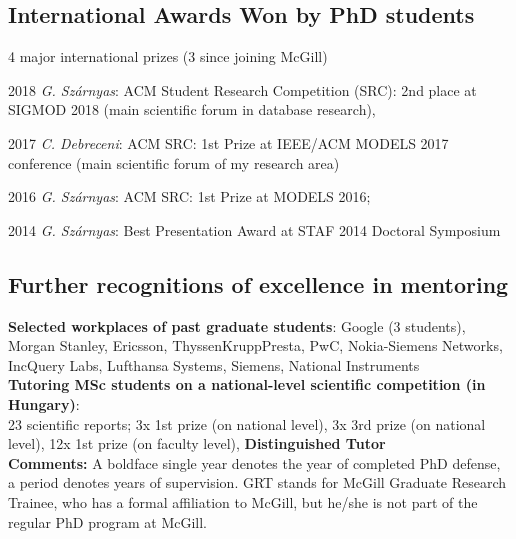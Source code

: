\subsection{International Awards Won by PhD students}

4 major international prizes (3 since joining McGill) 
\begin{yearlist}
\item[2018] \emph{G. Sz\'arnyas}: ACM Student Research Competition (SRC): 2nd place at SIGMOD 2018 (main scientific forum in database research),
\item[2017] \emph{C. Debreceni}: ACM SRC: 1st Prize at IEEE/ACM MODELS 2017 conference (main scientific forum of my research area)
\item[2016] \emph{G. Sz\'arnyas}: ACM SRC: 1st Prize at MODELS 2016; 
\item[2014] \emph{G. Sz\'arnyas}: Best Presentation Award at STAF 2014 Doctoral Symposium
\end{yearlist}

\subsection{Further recognitions of excellence in mentoring}

\textbf{Selected workplaces of past graduate students}: Google (3 students), Morgan Stanley, Ericsson, ThyssenKruppPresta, PwC, Nokia-Siemens Networks, 
IncQuery Labs, Lufthansa Systems, Siemens, National Instruments \\

\noindent
\textbf{Tutoring MSc students on a national-level scientific competition (in Hungary)}: \\
23 scientific reports; 3x 1st prize (on national level), 3x 3rd prize (on national
level), 12x 1st prize (on faculty level), %
\textbf{Distinguished Tutor}  \\%

\noindent
\textbf{Comments:} A boldface single year denotes the year of completed PhD defense, a period denotes years of supervision. GRT stands for McGill Graduate Research Trainee, who has a formal affiliation to McGill, but he/she is not part of the regular PhD program at McGill. \\

